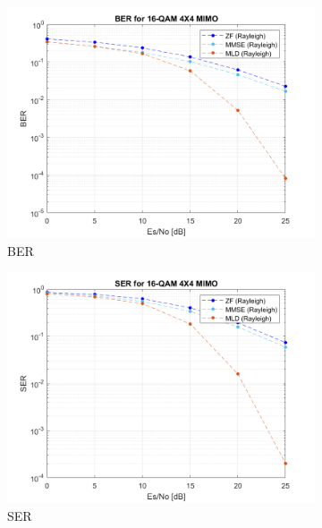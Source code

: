 \documentclass{article}
\begin{document}
\begin{figure}[H]
	\centering
	\begin{subfigure}{0.5\textwidth}
		\centerline{\includegraphics[width=1\textwidth]{d_Es_BER.png}}
		\caption{BER}
	\end{subfigure}%
	\begin{subfigure}{0.5\textwidth}
		\centerline{\includegraphics[width=1\textwidth]{d_Es_SER.png}}
		\caption{SER}
	\end{subfigure}\\%
	\begin{subfigure}{0.5\textwidth}

\end{subfigure}
\end{figure}
\end{document}
